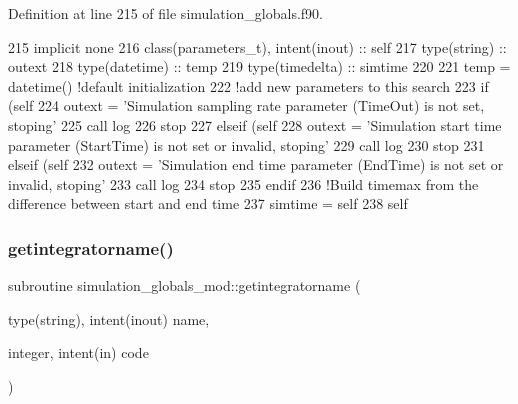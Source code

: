 Definition at line 215 of file simulation\+\_\+globals.\+f90.


\begin{DoxyCode}
215     \textcolor{keywordtype}{implicit none}
216     \textcolor{keywordtype}{class}(parameters\_t), \textcolor{keywordtype}{intent(inout)} :: self
217     \textcolor{keywordtype}{type}(string) :: outext
218     \textcolor{keywordtype}{type}(datetime) :: temp
219     \textcolor{keywordtype}{type}(timedelta) :: simtime
220 
221     temp = datetime() \textcolor{comment}{!default initialization}
222     \textcolor{comment}{!add new parameters to this search}
223     \textcolor{keywordflow}{if} (self%
224         outext = \textcolor{stringliteral}{'Simulation sampling rate parameter (TimeOut) is not set, stoping'}
225         \textcolor{keyword}{call }log%
226         stop
227     \textcolor{keywordflow}{elseif} (self%
228         outext = \textcolor{stringliteral}{'Simulation start time parameter (StartTime) is not set or invalid, stoping'}
229         \textcolor{keyword}{call }log%
230         stop
231     \textcolor{keywordflow}{elseif} (self%
232         outext = \textcolor{stringliteral}{'Simulation end time parameter (EndTime) is not set or invalid, stoping'}
233         \textcolor{keyword}{call }log%
234         stop
235 \textcolor{keywordflow}{    endif}
236     \textcolor{comment}{!Build timemax from the difference between start and end time}
237     simtime = self%
238     self%
\end{DoxyCode}
\mbox{\label{namespacesimulation__globals__mod_a68e871ed8e5d3930884e968c6fdafddc}} 
\subsubsection{\texorpdfstring{getintegratorname()}{getintegratorname()}}
{\footnotesize\ttfamily subroutine simulation\+\_\+globals\+\_\+mod\+::getintegratorname (\begin{DoxyParamCaption}\item[{type(string), intent(inout)}]{name,  }\item[{integer, intent(in)}]{code }\end{DoxyParamCaption})\hspace{0.3cm}{\ttfamily [private]}}




